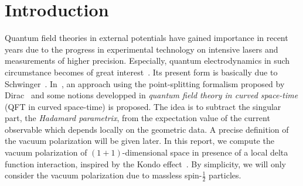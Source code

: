 \section{Introduction}
Quantum field theories in external potentials have gained importance in recent years due to the progress in experimental technology on intensive lasers and measurements of higher precision.
Especially, quantum electrodynamics in such circumstance becomes of great interest~\cite{Mohr1998}. 
Its present form is basically due to Schwinger~\cite{Schwinger1951}. 
In~\cite{Zahn2015}, an approach using the point-splitting formalism proposed by Dirac~\cite{Dirac1934} and some notions developped in \textit{quantum field theory in curved space-time} (QFT in curved space-time) is proposed. 
The idea is to subtract the singular part, the \textit{Hadamard parametrix}, from the expectation value of the current observable which depends locally on the geometric data. 
A precise definition of the vacuum polarization will be given later.
In this report, we compute the vacuum polarization of %
$(1+1)$-dimensional space in presence of a local delta function interaction, inspired by the Kondo effect~\cite{Erdmenger2013}.
By simplicity, we will only consider the vacuum polarization due to massless spin-$\frac 1 2$ particles.
\\\\
%
%
%
